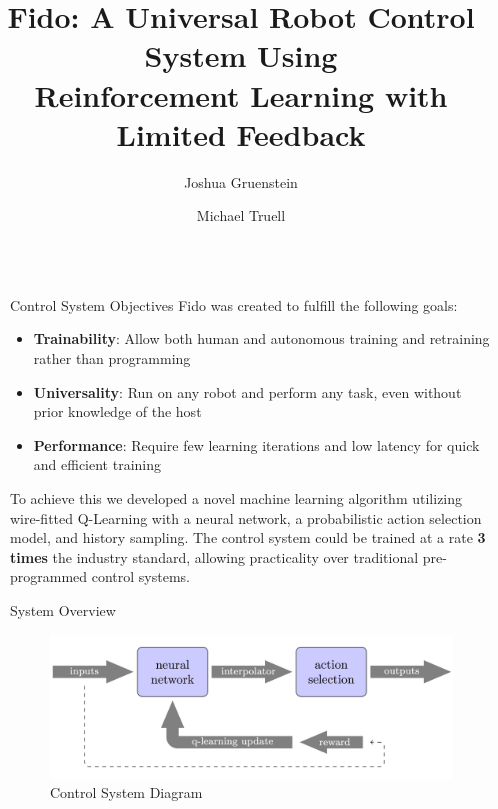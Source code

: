 \documentclass[final]{beamer}
\title{Fido: A Universal Robot Control System Using\\Reinforcement Learning with Limited Feedback}
\author{\LARGE Joshua Gruenstein \and Michael Truell}
\institute{\mbox{}}
\newlength{\sepwid}
\newlength{\onecolwid}
\begin{document}
\setlength{\belowcaptionskip}{2ex}
\setlength\belowdisplayshortskip{2ex}

\begin{frame}[t]
\begin{columns}[t]

\begin{column}{\sepwid}\end{column}
\begin{column}{\onecolwid}

	\begin{alertblock}{Control System Objectives}
		Fido was created to fulfill the following goals:
		\begin{itemize}
			\item \textbf{Trainability}: Allow both human and autonomous training and retraining rather than programming
			\item \textbf{Universality}: Run on any robot and perform any task, even without prior knowledge of the host
			\item \textbf{Performance}: Require few learning iterations and low latency for quick and efficient training
		\end{itemize}
		To achieve this we developed a novel machine learning algorithm utilizing wire-fitted Q-Learning with a neural network, a probabilistic action selection model, and history sampling.  The control system could be trained at a rate \textbf{3 times} the industry standard, allowing practicality over traditional pre-programmed control systems.
	\end{alertblock}

	\begin{block}{System Overview}
		\begin{figure}
			\centering
			\includegraphics[width=\linewidth]{Figures/diagramRendered.png}
			\caption{Control System Diagram}
		\end{figure}
		\vspace{-1cm}



\end{block}
\end{column}
\end{columns}
\end{frame}
\end{document}
